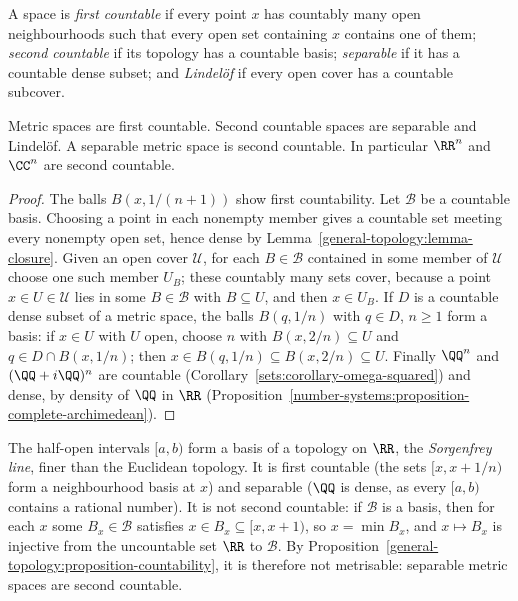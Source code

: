 \begin{definition}\label{general-topology:definition-countability}
A space is \emph{first countable} if every point $x$ has countably many open neighbourhoods such that every open set containing $x$
contains one of them; \emph{second countable} if its topology has a countable basis; \emph{separable} if it has a countable dense subset;
and \emph{Lindel\"of} if every open cover has a countable subcover.
\end{definition}

\begin{proposition}\label{general-topology:proposition-countability}
Metric spaces are first countable. Second countable spaces are separable and Lindel\"of. A separable metric space is second countable.
In particular $\RR^n$ and $\CC^n$ are second countable.
\end{proposition}

\begin{proof}
The balls $B(x, 1/(n+1))$ show first countability. Let $\mathcal{B}$ be a countable basis. Choosing a point in each nonempty member gives a
countable set meeting every nonempty open set, hence dense by Lemma~\ref{general-topology:lemma-closure}. Given an open cover $\mathcal{U}$,
for each $B \in \mathcal{B}$ contained in some member of $\mathcal{U}$ choose one such member $U_B$; these countably many sets cover, because a
point $x \in U \in \mathcal{U}$ lies in some $B \in \mathcal{B}$ with $B \subseteq U$, and then $x \in U_B$. If $D$ is a countable dense subset of a metric space,
the balls $B(q, 1/n)$ with $q \in D$, $n \geq 1$ form a basis: if $x \in U$ with $U$ open, choose $n$ with $B(x, 2/n) \subseteq U$ and $q \in D \cap B(x, 1/n)$;
then $x \in B(q, 1/n) \subseteq B(x, 2/n) \subseteq U$. Finally $\QQ^n$ and $(\QQ + i\QQ)^n$ are countable
(Corollary~\ref{sets:corollary-omega-squared}) and dense, by density of $\QQ$ in $\RR$
(Proposition~\ref{number-systems:proposition-complete-archimedean}).
\end{proof}

\begin{counterexample}\label{general-topology:counterexample-sorgenfrey}
The half-open intervals $[a, b)$ form a basis of a topology on $\RR$, the \emph{Sorgenfrey line}, finer than the Euclidean topology. It is first countable (the sets $[x, x + 1/n)$ form a neighbourhood basis at $x$) and separable
($\QQ$ is dense, as every $[a, b)$ contains a rational number). It is not second countable: if $\mathcal{B}$ is a basis, then for each $x$ some $B_x \in \mathcal{B}$ satisfies $x \in B_x \subseteq [x, x + 1)$, so $x = \min B_x$, and $x \mapsto B_x$ is
injective from the uncountable set $\RR$ to $\mathcal{B}$. By Proposition~\ref{general-topology:proposition-countability}, it is therefore not metrisable: separable metric spaces are second countable.
\end{counterexample}

